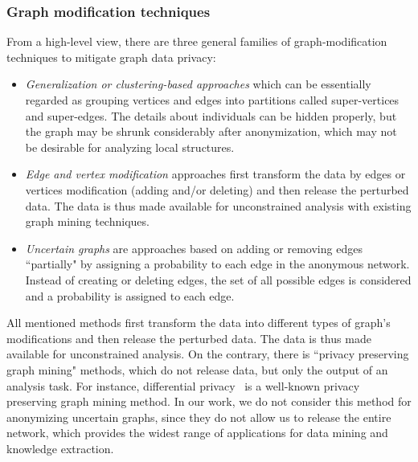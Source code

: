 \subsubsection{Graph modification techniques}
From a high-level view, there are three general families of graph-modification techniques to mitigate graph data privacy: 

\begin{itemize}
	\vspace{-2mm}
	\itemsep0em 
    \item {\em Generalization or clustering-based approaches} which can be essentially regarded as grouping vertices and edges into partitions called super-vertices and super-edges. The details about individuals can be hidden properly, but the graph may be shrunk considerably after anonymization, which may not be desirable for analyzing local structures. 
    \item {\em Edge and vertex modification} approaches first transform the data by edges or vertices modification (adding and/or deleting) and then release the perturbed data. The data is thus made available for unconstrained analysis with existing graph mining techniques. 
    \item {\em Uncertain graphs} are approaches based on adding or removing edges ``partially" by assigning a probability to each edge in the anonymous network. Instead of creating or deleting edges, the set of all possible edges is considered and a probability is assigned to each edge. 
\end{itemize}

All mentioned methods first transform the data into different types of graph's modifications and then release the perturbed data. The data is thus made available for unconstrained analysis. On the contrary, there is ``privacy preserving graph mining" methods, which do not release data, but only the output of an analysis task. For instance, differential privacy~\cite{Jorgensen2016} is a well-known privacy preserving graph mining method. In our work, we do not consider this method for anonymizing uncertain graphs, since they do not allow us to release the entire network, which provides the widest range of applications for data mining and knowledge extraction. 

